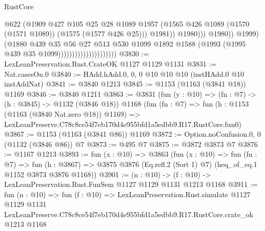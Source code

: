 \begin{lexlean}{RustCore}
\begin{coremodule}
                                                      @622
                                                      (@1909
                                                        @427
                                                        @105
                                                        @25
                                                        @28
                                                        @1089
                                                        @1957
                                                        (@1565
                                                          @426
                                                          @1089
                                                          (@1570 (@1571 @1089))
                                                          (@1575 (@1577 @426 @25)))
                                                        @1981))
                                                    @1980)))
                                              @1980))
                                          @1999)
                                        (@1880
                                          @439
                                          @35
                                          @56
                                          @27
                                          @513
                                          @530
                                          @1099
                                          @1892
                                          @1588
                                          (@1993 (@1995 @439 @35 @1099)))))))))))))))))))))
@3830 := LexLeanPreservation.Rust.CrateOK @1127 @1129 @1131
@3831 := Nat.casesOn.{0}
@3840 := HAdd.hAdd.{0, 0, 0} @10 @10 @10 (instHAdd.{0} @10 instAddNat)
@3841 := @3840 @1213
@3845 := @1153 (@1163 (@3841 @18)) @1169
@3846 := @3840 @1211
@3863 := @3831
    (fun (y : @10) => (fn : @7) -> (h : @3845) -> @1132 (@3846 @18))
    @1168
    (fun (fn : @7) =>
    fun (h : @1153 (@1163 (@3840 Nat.zero @18)) @1169) =>
    LexLeanPreserve.C78c8ce54f7eb170d4e955bfd1a5edbb9.R17.RustCore.fun0)
@3867 := @1153 (@1163 (@3841 @86)) @1169
@3872 := Option.noConfusion.{0, 0} (@1132 (@3846 @86)) @7
@3873 := @495 @7
@3875 := @3872 @3873 @7
@3876 := @1167 @1213
@3893 := fun (x : @10) =>
  @3863
    (fun (x : @10) =>
    fun (fn : @7) =>
    fun (h : @3867) =>
    @3875 @3876 (Eq.refl.{2} (Sort 1) @7) (heq_of_eq.{1} @1152 @3873 @3876 @1168))
@3901 := (n : @10) -> (f : @10) -> LexLeanPreservation.Rust.FunSem @1127 @1129 @1131 @1213 @1168
@3911 := fun (n : @10) =>
  fun (f : @10) =>
  LexLeanPreservation.Rust.simulate
    @1127
    @1129
    @1131
    LexLeanPreserve.C78c8ce54f7eb170d4e955bfd1a5edbb9.R17.RustCore.crate_ok
    @1213
    @1168
\end{coremodule}
\end{lexlean}
